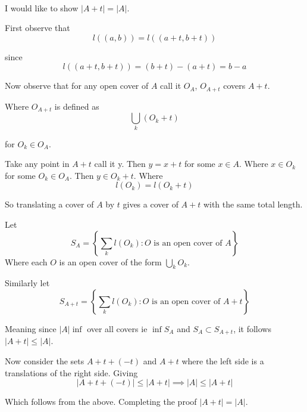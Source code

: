 \documentclass[12pt]{article}
\makeatletter
\theoremstyle{plain}
\theoremstyle{definition}
\theoremstyle{definition}
\theoremstyle{remark}
\renewenvironment{proof}[1][\proofname]{\par
\pushQED{\qed}\normalfont\topsep6\p@\@plus6\p@\relax
\trivlist\item[\hskip\labelsep\small\itshape #1\@addpunct{.}]\ignorespaces\mbox{}\\
}{\popQED\endtrivlist\@endpefalse}
\makeatother
\begin{document}
\begin{proof}[Proof: Translation Invariance]
    I would like to show $|A + t| = |A|$.

    First observe that 
    \begin{equation*}
        l((a, b)) = l((a + t, b + t))
    \end{equation*}
    
    since 
    \begin{equation*}
        l((a + t, b +t)) = (b + t) - (a + t) = b - a
    \end{equation*}

    Now observe that for any open cover of $A$ call it $O_A$, $O_{A+t}$ covers $A + t$. 
    
    Where
    $O_{A + t}$ is defined as 
    \begin{equation*}
        \bigcup_k (O_k + t)
    \end{equation*}
    
    for $O_k \in O_A$. 
    
    Take any point in
    $A + t$ call it y. Then $y = x + t$ for some $x \in A$. Where $x \in O_k$ for some $O_k \in O_A$.
    Then $y \in O_k + t$. Where 
    \begin{equation*}
        l(O_k) = l(O_k + t)
    \end{equation*}

    So translating a cover of $A$ by $t$ gives a cover of $A + t$ with the same total length.

    Let 
    \begin{equation*}
        S_A = \left\{ \sum_k l(O_k): O \text{ is an open cover of } A \right\}
    \end{equation*}
    Where each $O$ is an open cover of the form $\bigcup_k O_k$.

    Similarly let
    \begin{equation*}
        S_{A + t} = \left\{ \sum_k l(O_k): O \text{ is an open cover of } A + t \right\}
    \end{equation*}

    Meaning since $|A| \inf$ over all covers ie $\inf S_A$ and $S_A \subset S_{A + t}$,
    it follows $|A + t| \leq |A|$.

    Now consider the sets $A + t + (-t)$ and $A + t$ where the left side is a translations of the right
    side. Giving 
    \begin{equation*}
        |A + t + (-t)| \leq |A + t| \implies |A| \leq |A + t|
    \end{equation*} 

    Which follows from the above. Completing the proof $|A + t| = |A|$.

\end{proof}
\end{document}
